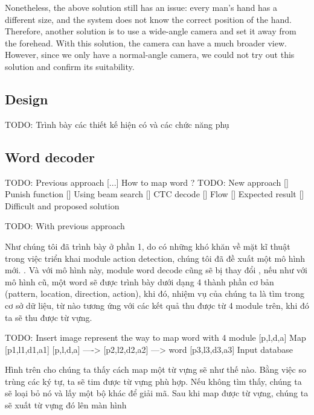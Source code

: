 Nonetheless, the above solution still has an issue: every man’s hand has a different size, and the system does not know the correct position of the hand. Therefore, another solution is to use a wide-angle camera and set it away from the forehead. With this solution, the camera can have a much broader view. However, since we only have a normal-angle camera, we could not try out this solution and confirm its suitability.

\subsection{ Design}
  TODO: Trình bày các thiết kế hiện có và các chức năng phụ

\subsection{Word decoder}
TODO:   Previous approach 
      [...] How to map word ?
TODO:   New approach
      [] Punish function
      [] Using beam search
      [] CTC decode
      [] Flow
      [] Expected result
      [] Difficult and proposed solution


    TODO: With previous approach

    Như chúng tôi đã trình bày ở phần 1, do có những khó khăn 
    về mặt kĩ thuật trong việc triển khai module
    action detection, chúng tôi đã đề xuất một mô hình mới.
    . Và với mô hình này, module word decode cũng sẽ bị thay đổi
    , nếu như với mô hình cũ, một word sẽ được trình bày dưới dạng
    4 thành phần cơ bản (pattern, location, direction, action),
    khi đó, nhiệm vụ của chúng ta là tìm trong cơ sở dữ liệu, từ nào
    tương ứng với các kết quả thu được từ 4 module trên, khi đó
    ta sẽ thu được từ vựng.

    TODO: Insert image represent the way to map word with 4 module
                              [p,l,d,a]
                        Map   [p1,l1,d1,a1]
              [p,l,d,a] ----> [p2,l2,d2,a2] ---> word
                              [p3,l3,d3,a3]
              Input             database

    Hình trên cho chúng ta thấy cách map một từ vựng sẽ như thế nào.
    Bằng việc so trùng các ký tự, ta sẽ tim được từ vựng phù hợp.
    Nếu không tìm thấy, chúng ta sẽ loại bỏ nó và lấy một bộ khác
    để giải mã.
    Sau khi map được từ vựng, chúng ta sẽ xuất từ vựng đó lên màn hình
